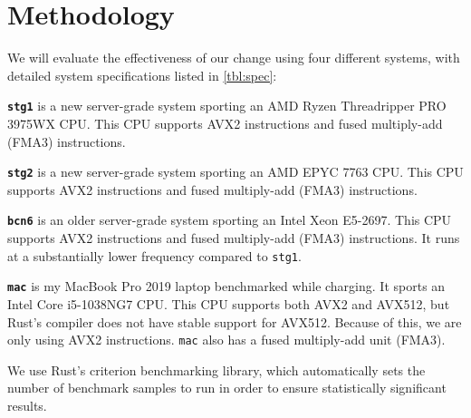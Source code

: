 \section{Methodology}

\tblSpecs

We will evaluate the effectiveness of our change using four different systems,
with detailed system specifications listed in \autoref{tbl:spec}:

\textbf{\texttt{stg1}} is a new server-grade system sporting an AMD Ryzen
Threadripper PRO 3975WX CPU. This CPU supports AVX2 instructions and fused
multiply-add (FMA3) instructions.

\textbf{\texttt{stg2}} is a new server-grade system sporting an AMD EPYC 7763 CPU.
This CPU supports AVX2 instructions and fused multiply-add (FMA3) instructions.

\textbf{\texttt{bcn6}} is an older server-grade system sporting an Intel Xeon
E5-2697.
This CPU supports AVX2 instructions and fused multiply-add (FMA3) instructions.
It runs at a substantially lower frequency compared to \texttt{stg1}.

\textbf{\texttt{mac}} is my MacBook Pro 2019 laptop benchmarked while charging.
It sports an Intel Core i5-1038NG7 CPU. This CPU supports both AVX2 and AVX512,
but Rust's compiler does not have stable support for AVX512. Because of this,
we are only using AVX2 instructions.
\texttt{mac} also has a fused multiply-add unit (FMA3).

We use Rust's criterion benchmarking library, which automatically sets the
number of benchmark samples to run in order to ensure statistically significant
results.
